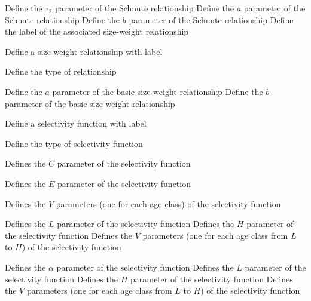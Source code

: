  {Define the $\tau_2$ parameter of the Schnute relationship}
 {Define the $a$ parameter of the Schnute relationship}
 {Define the $b$ parameter of the Schnute relationship}
 {Define the label of the associated size-weight relationship}
\par{} {Define a size-weight relationship with label}\par
{} {Define the type of relationship}
\par\textbf{}\par
\par\textbf{}\par
{} {Define the $a$ parameter of the basic size-weight relationship}
 {Define the $b$ parameter of the basic size-weight relationship}
\par{} {Define a selectivity function with label}\par
{} {Define the type of selectivity function}
\par\textbf{}\par
{} {Defines the $C$ parameter of the selectivity function}
\par\textbf{}\par
{} {Defines the $E$ parameter of the selectivity function}
\par\textbf{}\par
{} {Defines the $V$ parameters (one for each age class) of the selectivity function}
\par\textbf{}\par
{} {Defines the $L$ parameter of the selectivity function}
 {Defines the $H$ parameter of the selectivity function}
 {Defines the $V$ parameters (one for each age class from $L$ to $H$) of the selectivity function}
\par\textbf{}\par
{} {Defines the $\alpha$ parameter of the selectivity function}
 {Defines the $L$ parameter of the selectivity function}
 {Defines the $H$ parameter of the selectivity function}
 {Defines the $V$ parameters (one for each age class from $L$ to $H$) of the selectivity function}
